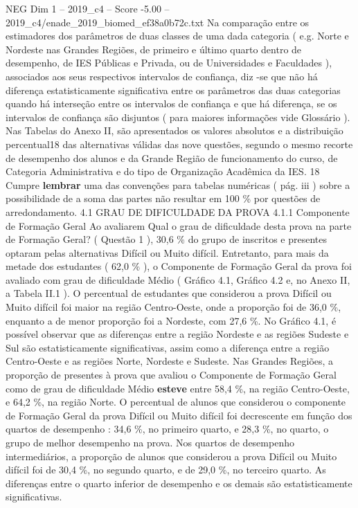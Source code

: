 \begin{textsample}{NEG Dim 1 – 2019\_c4 – Score -5.00 – 2019\_c4/enade\_2019\_biomed\_ef38a0b72c.txt}
Na comparação entre os estimadores dos parâmetros de duas classes de uma dada categoria ( e.g.
Norte e Nordeste nas Grandes Regiões, de primeiro e último quarto dentro de desempenho, de IES Públicas e Privada, ou de Universidades e Faculdades ), associados aos seus respectivos intervalos de confiança, diz -se que não há diferença estatisticamente significativa entre os parâmetros das duas categorias quando há interseção entre os intervalos de confiança e que há diferença, se os intervalos de confiança são disjuntos ( para maiores informações vide Glossário ).
Nas Tabelas do Anexo II, são apresentados os valores absolutos e a distribuição percentual18 das alternativas válidas das nove questões, segundo o mesmo recorte de desempenho dos alunos e da Grande Região de funcionamento do curso, de Categoria Administrativa e do tipo de Organização Acadêmica da IES. 18 Cumpre \textbf{lembrar} uma das convenções para tabelas numéricas ( pág. iii ) sobre a possibilidade de a soma das partes não resultar em 100 \% por questões de arredondamento. 4.1 GRAU DE DIFICULDADE DA PROVA 4.1.1 Componente de Formação Geral Ao avaliarem Qual o grau de dificuldade desta prova na parte de Formação Geral? ( Questão 1 ), 30,6 \% do grupo de inscritos e presentes optaram pelas alternativas Difícil ou Muito difícil.
Entretanto, para mais da metade dos estudantes ( 62,0 \% ), o Componente de Formação Geral da prova foi avaliado com grau de dificuldade Médio ( Gráfico 4.1, Gráfico 4.2 e, no Anexo II, a Tabela II.1 ).
O percentual de estudantes que considerou a prova Difícil ou Muito difícil foi maior na região Centro-Oeste, onde a proporção foi de 36,0 \%, enquanto a de menor proporção foi a Nordeste, com 27,6 \%.
No Gráfico 4.1, é possível observar que as diferenças entre a região Nordeste e as regiões Sudeste e Sul são estatisticamente significativas, assim como a diferença entre a região Centro-Oeste e as regiões Norte, Nordeste e Sudeste.
Nas Grandes Regiões, a proporção de presentes à prova que avaliou o Componente de Formação Geral como de grau de dificuldade Médio \textbf{esteve} entre 58,4 \%, na região Centro-Oeste, e 64,2 \%, na região Norte.
O percentual de alunos que considerou o componente de Formação Geral da prova Difícil ou Muito difícil foi decrescente em função dos quartos de desempenho : 34,6 \%, no primeiro quarto, e 28,3 \%, no quarto, o grupo de melhor desempenho na prova.
Nos quartos de desempenho intermediários, a proporção de alunos que considerou a prova Difícil ou Muito difícil foi de 30,4 \%, no segundo quarto, e de 29,0 \%, no terceiro quarto.
As diferenças entre o quarto inferior de desempenho e os demais são estatisticamente significativas.

\end{textsample}
